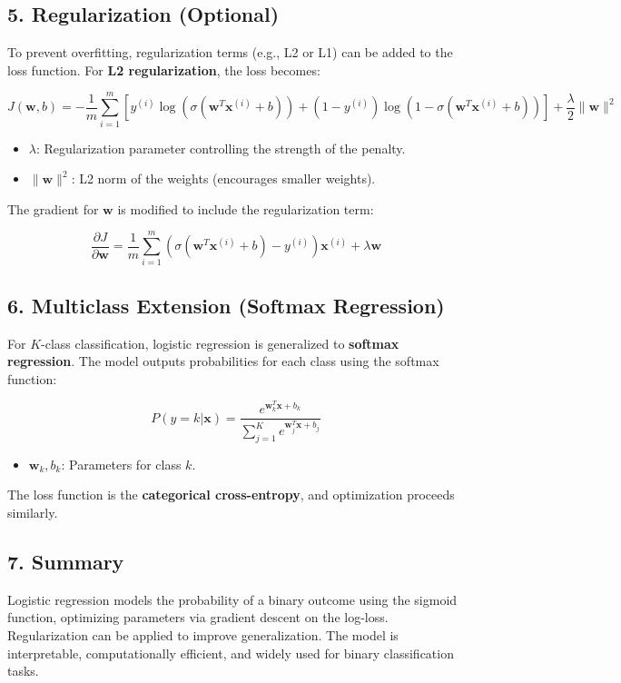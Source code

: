 \documentclass[a4paper,12pt]{article}
\begin{document}
\subsection*{5. Regularization (Optional)}
To prevent overfitting, regularization terms (e.g., L2 or L1) can be added to the loss function. For \textbf{L2 regularization}, the loss becomes:

\[
J(\mathbf{w}, b) = -\frac{1}{m} \sum_{i=1}^m \left[ y^{(i)} \log(\sigma(\mathbf{w}^T \mathbf{x}^{(i)} + b)) + (1 - y^{(i)}) \log(1 - \sigma(\mathbf{w}^T \mathbf{x}^{(i)} + b)) \right] + \frac{\lambda}{2} \| \mathbf{w} \|^2
\]

\begin{itemize}
    \item $\lambda$: Regularization parameter controlling the strength of the penalty.
    \item $\| \mathbf{w} \|^2$: L2 norm of the weights (encourages smaller weights).
\end{itemize}

The gradient for $\mathbf{w}$ is modified to include the regularization term:

\[
\frac{\partial J}{\partial \mathbf{w}} = \frac{1}{m} \sum_{i=1}^m \left( \sigma(\mathbf{w}^T \mathbf{x}^{(i)} + b) - y^{(i)} \right) \mathbf{x}^{(i)} + \lambda \mathbf{w}
\]

\subsection*{6. Multiclass Extension (Softmax Regression)}
For $K$-class classification, logistic regression is generalized to \textbf{softmax regression}. The model outputs probabilities for each class using the softmax function:

\[
P(y=k | \mathbf{x}) = \frac{e^{\mathbf{w}_k^T \mathbf{x} + b_k}}{\sum_{j=1}^K e^{\mathbf{w}_j^T \mathbf{x} + b_j}}
\]

\begin{itemize}
    \item $\mathbf{w}_k, b_k$: Parameters for class $k$.
\end{itemize}

The loss function is the \textbf{categorical cross-entropy}, and optimization proceeds similarly.

\subsection*{7. Summary}
Logistic regression models the probability of a binary outcome using the sigmoid function, optimizing parameters via gradient descent on the log-loss. Regularization can be applied to improve generalization. The model is interpretable, computationally efficient, and widely used for binary classification tasks.
\end{document}
